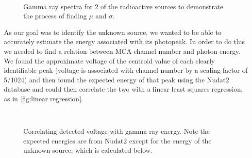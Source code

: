 \documentclass[11pt]{article}
\numberwithin{equation}{section}
\numberwithin{figure}{section}
\numberwithin{table}{section}
\begin{document}
    \begin{figure}[H]%
        \centering
        \,
        \caption{Gamma ray spectra for 2 of the radioactive sources to demonstrate the process of finding $\mu$ and $\sigma$.}
        \label{fig:Cs and Na spectra}
    \end{figure}

    \par As our goal was to identify the unknown source, we wanted to be able to accurately estimate the energy associated with its photopeak. In order to do this we needed to find a relation between MCA channel number and photon energy. We found the approximate voltage of the centroid value of each clearly identifiable peak (voltage is associated with channel number by a scaling factor of 5/1024) and then found the expected energy of that peak using the Nudat2 database \cite{nudat} and could then correlate the two with a linear least squares regression, as in \autoref{fig:linear regression}.

    \begin{figure}[H]%
        \centering
        \,
        \caption{Correlating detected voltage with gamma ray energy. Note the expected energies are from Nudat2 \cite{nudat} except for the energy of the unknown source, which is calculated below.}
        \label{fig:linear regression}
    \end{figure}
\end{document}
